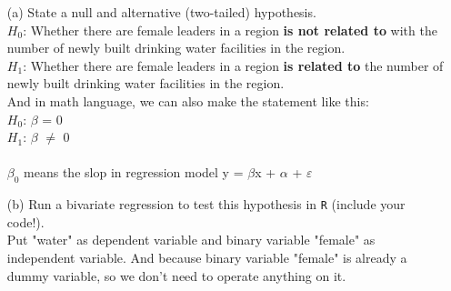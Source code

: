 \documentclass[12pt,letterpaper]{article}
\begin{document}
\newpage
\begin{enumerate}
	\item [(a)] State a null and alternative (two-tailed) hypothesis. 
	\vspace{.5cm} \\
	$H_0$: Whether there are female leaders in a region \textbf{is not related to} with the number of newly built drinking water facilities in the region. \\
	
	$H_1$: Whether there are female leaders in a region \textbf{is related to} the number of newly built drinking water facilities in the region. \\
	
	And in math language, we can also make the statement like this: \\
	
	$H_0$: $\beta$ = 0\\
	$H_1$: $\beta$ $\neq$ 0 \\
	\vspace{.5cm} \\
	$\beta_0$ means the slop in regression model y = $\beta$x + $\alpha$ + $\varepsilon$
		
	\newpage
	\item [(b)] Run a bivariate regression to test this hypothesis in \texttt{R} (include your code!).
	\vspace{.5cm}\\
	Put "water" as dependent variable and binary variable "female" as independent variable. And because binary variable "female" is already a dummy variable, so we don't need to operate anything on it.\\
	

\end{enumerate}
\end{document}
